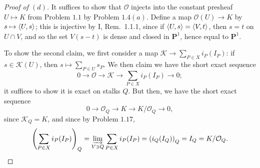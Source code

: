 \documentclass[12pt,letterpaper]{article}
\theoremstyle{definition}
\theoremstyle{remark}
\numberwithin{equation}{section}
\numberwithin{figure}{problem}
\newcommand{\OO}{\mathcal{O}}
\begin{document}
\begin{proof}[Proof of $(d)$]
  It suffices to show that $\OO$ injects into the constant presheaf $U \mapsto K$ from Problem $1.1$ by Problem $1.4(a)$. Define a map $\OO(U) \to K$ by $s \mapsto \braket{U,s}$; this is injective by I, Rem.~1.1.1, since if $\braket{U,s} = \braket{V,t}$, then $s=t$ on $U \cap V$, and so the set $V(s-t)$ is dense and closed in $\mathbf{P}^1$, hence equal to $\mathbf{P}^1$. 
  \par To show the second claim, we first consider a map $\mathscr{K} \to \sum_{P \in X} i_P(I_P)$: if $s \in \mathscr{K}(U)$, then $s \mapsto \sum_{P \in U} s_P$. We then claim we have the short exact sequence
  \begin{equation*}
    0 \to \OO \to \mathscr{K} \to \sum_{P \in X} i_P(I_P) \to 0;
  \end{equation*}
  it suffices to show it is exact on stalks $Q$. But then, we have the short exact sequence
  \begin{equation*}
    0 \to \OO_Q \to K \to K/\OO_Q \to 0,
  \end{equation*}
  since $\mathscr{K}_Q = K$, and since by Problem $1.17$,
  \begin{equation*}
    \left( \sum_{P \in X} i_P(I_P) \right)_Q = \varinjlim_{V \ni Q} \sum_{P \in X} i_P(I_P) = \left(i_Q(I_Q)\right)_Q = I_Q = K/\OO_Q.\qedhere
  \end{equation*}
\end{proof}
\end{document}
